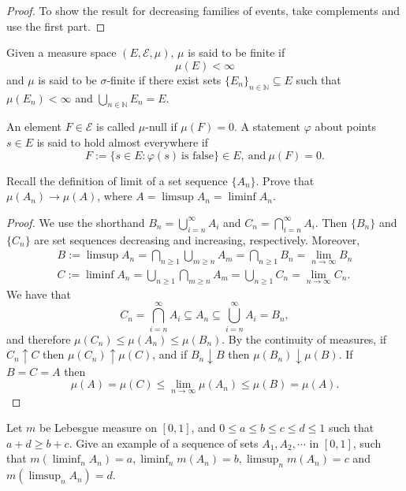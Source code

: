 \documentclass[11pt,singlecolumn, openany, citestyle=authoryear]{elegantbook}
\begin{document}
\begin{CJK}{UTF8}{gbsn}
\begin{proof}
To show the result for decreasing families of events, take complements and use the first part.
\end{proof}

\begin{definition}
Given a measure space $(E, \mathcal{E} , \mu)$, $\mu$ is said to be finite if
$$\mu(E) < \infty$$
and $\mu$ is said to be $\sigma$-finite if there exist sets 
$\{E_n\}_{n\in \mathbb{N}} \subseteq E$ such that
$\mu(E_n) < \infty$ and 
$\displaystyle \bigcup_{n\in \mathbb{N}}E_n = E.$
\end{definition}
\begin{definition}
An element $F \in \mathcal{E} $ is called $\mu$-null if $\mu(F) = 0$. 
A statement $\varphi$ about points $s \in E$ is said to
hold almost everywhere if
$$
F := \{s \in E : \varphi (s) \ \text{is false}\} \in E,\ \text{and} \ \mu(F) = 0.
$$
\end{definition}

\begin{exercise}
    Recall the definition of limit of a set sequence $\{A_n\}$. Prove that 
    $\mu(A_n)\to \mu(A)$, where $A = \limsup A_n = \liminf A_n$.
\end{exercise}
\begin{proof}
    We use the shorthand $\displaystyle B_n =\bigcup_{i=n}^{\infty} A_i$ and 
    $\displaystyle C_n=\bigcap_{i=n}^{\infty} A_i$. Then 
    $\{B_n\}$ and $\{C_n\}$ are set sequences decreasing and increasing, respectively. 
    Moreover, 
    \begin{gather*}
    B:= \limsup A_n = \bigcap_{n \geqslant 1}\bigcup_{m \geqslant n} A_m=
    \bigcap_{n \geqslant 1}B_n = \lim_{n \to \infty} B_n \\
    C:= \liminf A_n = \bigcup_{n \geqslant 1}\bigcap_{m \geqslant n} A_m
    =\bigcup_{n \geqslant 1}C_n= \lim_{n \to \infty}C_n.
    \end{gather*}
    We have that
$$
C_n=\bigcap_{i=n}^{\infty} A_i \subseteq A_n \subseteq \bigcup_{i=n}^{\infty} A_i=B_n,
$$
and therefore $\mu\left(C_n\right) \leq \mu\left(A_n\right) \leq
 \mu\left(B_n\right)$. By the continuity of measures, if 
$C_n \uparrow C$ then $\mu\left(C_n\right) \uparrow \mu(C)$, 
and if $B_n \downarrow B$ then $\mu\left(B_n\right) \downarrow \mu(B)$. 
If $B=C=A$ then
$$
\mu(A)=\mu(C) \leq \lim _{n \rightarrow \infty} \mu\left(A_n\right) \leq 
\mu(B)=\mu(A) .
$$
\end{proof}

\begin{exercise}
    Let $m$ be Lebesgue measure on $[0, 1]$, and $0 \leqslant a \leqslant b \leqslant c \leqslant d \leqslant 1$
    such that $a+d \geqslant b+c$.
Give an example of a sequence of sets $A_1, A_2, \cdots$ in $[0, 1]$, 
such that $m(\liminf_n A_n) = a,
\liminf_n m(A_n) = b, \limsup_n m(A_n) = c$ and $m(\limsup_n A_n) = d$.
\end{exercise}



\end{CJK}
\end{document}
